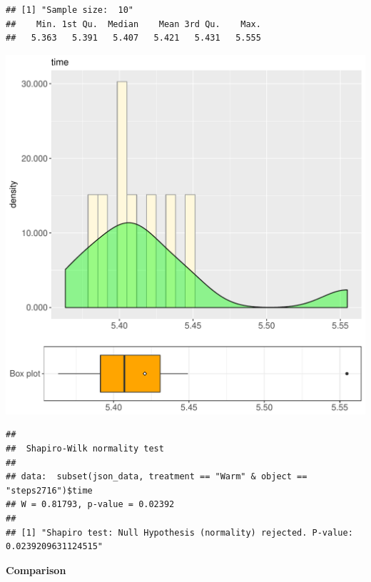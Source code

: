 \documentclass{article}\usepackage[]{graphicx}\usepackage[]{color}
\makeatletter
\def\maxwidth{ %
  \ifdim\Gin@nat@width>\linewidth
    \linewidth
  \else
    \Gin@nat@width
  \fi
}
\newenvironment{kframe}{%
 \def\at@end@of@kframe{}%
 \ifinner\ifhmode%
  \def\at@end@of@kframe{\end{minipage}}%
  \begin{minipage}{\columnwidth}%
 \fi\fi%
 \def\FrameCommand##1{\hskip\@totalleftmargin \hskip-\fboxsep
 \colorbox{shadecolor}{##1}\hskip-\fboxsep
     \hskip-\linewidth \hskip-\@totalleftmargin \hskip\columnwidth}%
 \MakeFramed {\advance\hsize-\width
   \@totalleftmargin\z@ \linewidth\hsize
   \@setminipage}}%
 {\par\unskip\endMakeFramed%
 \at@end@of@kframe}
\newenvironment{knitrout}{}{} %
\makeatother
\begin{document}
\begin{knitrout}
\color{fgcolor}\begin{kframe}
\begin{verbatim}
## [1] "Sample size:  10"
##    Min. 1st Qu.  Median    Mean 3rd Qu.    Max. 
##   5.363   5.391   5.407   5.421   5.431   5.555
\end{verbatim}
\end{kframe}
\includegraphics[width=\maxwidth]{figure/RH1_Warm_steps2716-1} 
\begin{kframe}\begin{verbatim}
## 
## 	Shapiro-Wilk normality test
## 
## data:  subset(json_data, treatment == "Warm" & object == "steps2716")$time
## W = 0.81793, p-value = 0.02392
## 
## [1] "Shapiro test: Null Hypothesis (normality) rejected. P-value: 0.0239209631124515"
\end{verbatim}
\end{kframe}
\end{knitrout}
  
 \textbf{Comparison}
  
\end{document}
